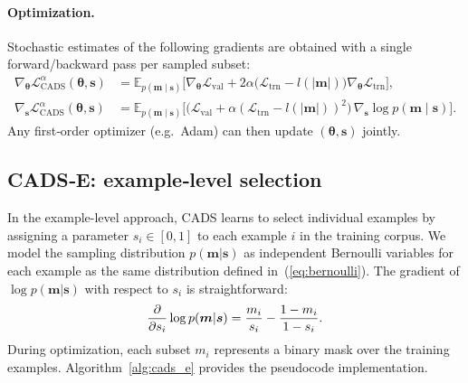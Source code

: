 \paragraph{Optimization.}  
Stochastic estimates of the following gradients are obtained with a single forward/backward pass per sampled subset:  
\begin{align}  
\nabla_{\bm{\theta}}\mathcal{L}^\alpha_{\text{CADS}}(\bm{\theta},\bm{s}) &=  
    \mathbb{E}_{p(\bm{m}\mid \bm{s})}  
    \bigl[  
        \nabla_{\bm{\theta}}\mathcal{L}_{\mathrm{val}}  
        +2\alpha\bigl(\mathcal{L}_{\mathrm{trn}}-l(|\bm{m}|)\bigr)\nabla_{\bm{\theta}}\mathcal{L}_{\mathrm{trn}}  
    \bigr], \\
\nabla_{\bm{s}}\mathcal{L}^\alpha_{\text{CADS}}(\bm{\theta},\bm{s}) &=  
    \mathbb{E}_{p(\bm{m}\mid \bm{s})}  
    \bigl[  
        \bigl(\mathcal{L}_{\mathrm{val}}+\alpha(\mathcal{L}_{\mathrm{trn}}-l(|\bm{m}|))^{2}\bigr)\,  
        \nabla_{\bm{s}}\log p(\bm{m}\mid \bm{s})  
    \bigr].  
\end{align}  
Any first‑order optimizer (e.g.~Adam) can then update $(\bm{\theta},\bm{s})$ jointly.  

\subsection{CADS‑E: example‑level selection}  
In the example-level approach, CADS learns to select individual examples by assigning a parameter $s_i \in [0,1]$ to each example $i$ in the training corpus.  
We model the sampling distribution $p(\bm{m}|\bm{s})$ as independent Bernoulli variables for each example as the same distribution defined in~(\ref{eq:bernoulli}).  
The gradient of $\log p(\bm{m}|\bm{s})$ with respect to $s_i$ is straightforward:  
\begin{equation} 
\small
    \frac{\partial}{\partial s_i} \log p(\bm{m}|\bm{s}) = \frac{m_i}{s_i} - \frac{1-m_i}{1-s_i}.  
    \label{eq:bernoulli_grad}  
\end{equation}  
During optimization, each subset $m_i$ represents a binary mask over the training examples.  
Algorithm~\ref{alg:cads_e} provides the pseudocode implementation.   

